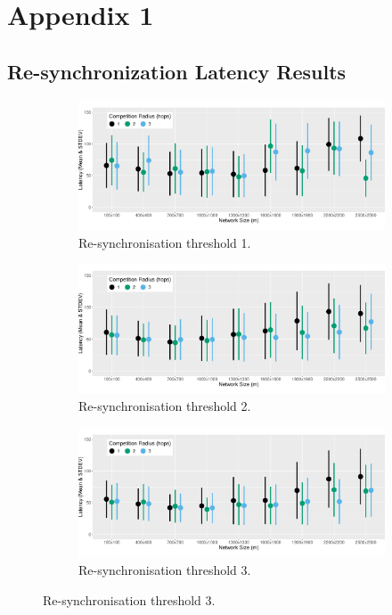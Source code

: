 \chapter{Appendix 1}
\label{app:a}
\section{Re-synchronization Latency Results}
\begin{figure}[H]
    
\centering
\begin{subfigure}{0.80\textwidth}
    \centering
    \includegraphics[width=\textwidth, keepaspectratio]{figure/Results/ParameterEvaluation/Latency/ResyncTreshold1_Latency.pdf}
    \caption{Re-synchronisation threshold 1.}
    \label{subfig:resync-treshold-1-latency}
\end{subfigure}
\begin{subfigure}{0.80\textwidth}
    \centering
    \includegraphics[width=\textwidth, keepaspectratio]{figure/Results/ParameterEvaluation/Latency/ResyncTreshold2_Latency.pdf}
    \caption{Re-synchronisation threshold 2.}
    \label{subfig:resync-treshold-2-latency}
\end{subfigure}
\begin{subfigure}{0.80\textwidth}
    \centering
    \includegraphics[width=\textwidth, keepaspectratio]{figure/Results/ParameterEvaluation/Latency/ResyncTreshold3_Latency.pdf}
    \caption{Re-synchronisation threshold 3.}
    \label{subfig:resync-treshold-3-latency}
\end{subfigure}


\end{figure}
